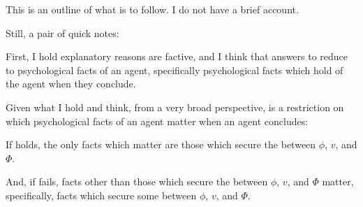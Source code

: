 \begin{note}
  This is an outline of what is to follow.
  I do not have a brief account.

  Still, a pair of quick notes:

  First, I hold explanatory reasons are factive, and I think that answers to \qWhy{} reduce to psychological facts of an agent, specifically psychological facts which hold of the agent when they conclude.%


  Given what I hold and think, from a very broad perspective, \issueInclusion{} is a restriction on which psychological facts of an agent matter when an agent concludes:

  If \issueInclusion{} holds, the only facts which matter are those which secure the \ros{} between \(\phi\), \(v\), and \(\Phi\).

  And, if \issueInclusion{} fails, facts other than those which secure the \ros{} between \(\phi\), \(v\), and \(\Phi\) matter, specifically, facts which secure some \ros{} between \(\phi\), \(v\), and \(\Phi\).
\end{note}



